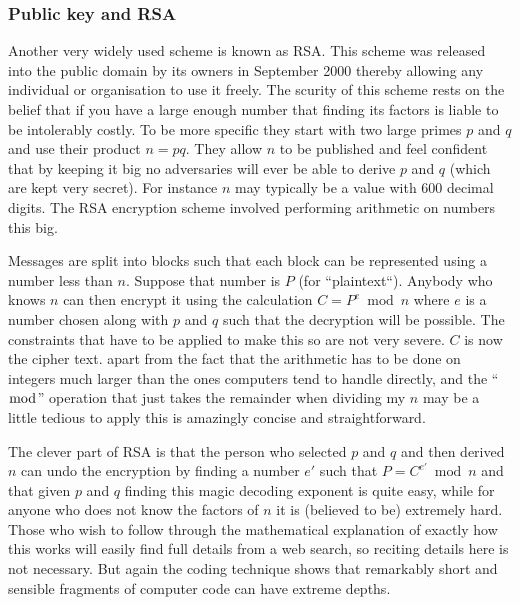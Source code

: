 \subsubsection{Public key and RSA}
Another very widely used scheme is known as RSA. This scheme was released into
the public domain by its owners in September 2000 thereby allowing any individual
or organisation to use it freely. The scurity of this scheme rests on the
belief that if you have a large enough number that finding its factors is liable
to be intolerably costly. To be more specific they start with two large primes $p$
and $q$ and use their product $n = p q$. They allow $n$ to be published and feel
confident that by keeping it big no adversaries will ever be able to derive $p$ and
$q$ (which are kept very secret). For instance $n$ may typically be a value
with 600 decimal digits. The RSA encryption scheme involved performing arithmetic
on numbers this big.

Messages are split into blocks such that each block can be represented using
a number less than $n$. Suppose that number is $P$ (for ``plaintext``).
Anybody who knows $n$ can then encrypt it using the calculation
$C = P^e \bmod n$ where $e$ is a number chosen along with $p$ and $q$ such that
the decryption will be possible. The constraints that have to be applied to make
this so are not very severe. $C$ is now the cipher text. apart from the fact that
the arithmetic has to be done on integers much larger than the ones computers
tend to handle directly, and the ``$\bmod$'' operation that just takes the remainder
when dividing my $n$ may be a little tedious to apply this is amazingly
concise and straightforward.

The clever part of RSA is that the person who selected $p$ and $q$ and then derived
$n$ can undo the encryption by finding a number $e'$ such that $P = C^{e'} \bmod n$
and that given $p$ and $q$ finding this magic decoding exponent is quite easy,
while for anyone who does not know the factors of $n$ it is (believed to be)
extremely hard. Those who wish to follow through the mathematical explanation of
exactly how this works will easily find full details from a web search, so
reciting details here is not necessary. But again the coding technique shows that
remarkably short and sensible fragments of computer code can have extreme depths. 

